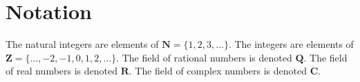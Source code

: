 \section{Notation}
\label{section-notation}

\noindent
The natural integers are elements of $\mathbf{N} = \{1, 2, 3, \ldots\}$.
The integers are elements of $\mathbf{Z} = \{\ldots, -2, -1, 0, 1, 2, \ldots\}$.
The field of rational numbers is denoted $\mathbf{Q}$.
The field of real numbers is denoted $\mathbf{R}$.
The field of complex numbers is denoted $\mathbf{C}$.







